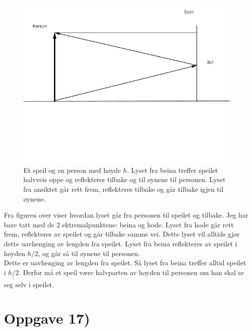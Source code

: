 \documentclass[a4paper,norsk, 10pt]{article}
\begin{document}
\begin{figure}[H]
\centering
\includegraphics[scale=0.7]{speil.png}
\caption{Et speil og en person med høyde $h$. Lyset fra beina treffer speilet halvveis oppe og reflekteres tilbake og til øynene til personen. Lyset fra ansiktet går rett frem, reflekteres tilbake og går tilbake igjen til øynene.}
\end{figure}



Fra figuren over viser hvordan lyset går fra personen til speilet og tilbake. Jeg har bare tatt med de 2 ektremalpunktene: beina og hode. Lyset fra hode går rett frem, reflekteres av speilet og går tilbake samme vei. Dette lyset vil alltids gjør dette uavhenging av lengden fra speilet. Lyset fra beina reflekteres av speilet i høyden $h/2$, og går så til øynene til personen.\\

Dette er uavhenging av lengden fra speilet. Så lyset fra beina treffer alltid speilet i $\underline{\underline{h/2}}$. Derfor må et speil være halvparten av høyden til personen om han skal se seg selv i speilet.


\section*{Oppgave 17)}
\end{document}
